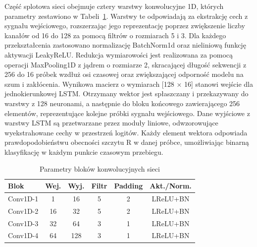 \documentclass[journal]{IEEEtran}
\begin{document}
{Część splotowa sieci obejmuje cztery warstwy konwolucyjne 1D, których parametry zestawiono w Tabeli~\ref{tab:ecg_layers}. Warstwy te odpowiadają za ekstrakcję cech z sygnału wejściowego, rozszerzając jego reprezentację poprzez zwiększenie liczby kanałów od 16 do 128 za pomocą filtrów o rozmiarach 5 i 3. Dla każdego przekształcenia zastosowano normalizację BatchNorm1d oraz nieliniową funkcję aktywacji LeakyReLU. Redukcja wymiarowości jest realizowana za pomocą operacji MaxPooling1D z jądrem o rozmiarze 2, skracającej długość sekwencji z 256 do 16 próbek wzdłuż osi czasowej oraz zwiększającej odporność modelu na szum i zakłócenia. Wynikowa macierz o wymiarach [128 × 16] stanowi wejście dla jednokierunkowej LSTM. Otrzymany wektor jest spłaszczany i przekazywany do warstwy z 128 neuronami, a następnie do bloku końcowego zawierającego 256 elementów, reprezentujące kolejne próbki sygnału wejściowego. Dane wyjściowe z warstwy LSTM są  przetwarzane przez moduły liniowe, odwzorowujące wyekstrahowane cechy w przestrzeń logitów. Każdy element wektora odpowiada prawdopodobieństwu obecności szczytu R w danej próbce, umożliwiając binarną klasyfikację w każdym punkcie czasowym przebiegu. 

\begin{table}[h!]
\centering
\caption{Parametry bloków konwolucyjnych sieci}
\label{tab:ecg_layers}
\begin{tabular}{|l|c|c|c|c|c|}
\hline
\textbf{Blok} & \textbf{Wej.} & \textbf{Wyj.} & \textbf{Filtr} & \textbf{Padding} & \textbf{Akt./Norm.} \\
\hline
Conv1D-1 & 1   & 16  & 5 & 2 & LReLU+BN \\
Conv1D-2 & 16  & 32  & 5 & 2 & LReLU+BN \\
Conv1D-3 & 32  & 64  & 3 & 1 & LReLU+BN \\
Conv1D-4 & 64  & 128 & 3 & 1 & LReLU+BN \\
\hline
\end{tabular}
\end{table}

}
\end{document}
